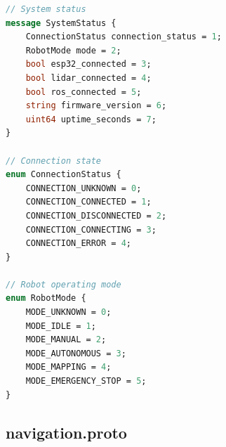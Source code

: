 \documentclass[11pt,letterpaper]{article}
\begin{document}
\begin{lstlisting}[language=Protobuf, caption=star/telemetry.proto]
// System status
message SystemStatus {
    ConnectionStatus connection_status = 1;
    RobotMode mode = 2;
    bool esp32_connected = 3;
    bool lidar_connected = 4;
    bool ros_connected = 5;
    string firmware_version = 6;
    uint64 uptime_seconds = 7;
}

// Connection state
enum ConnectionStatus {
    CONNECTION_UNKNOWN = 0;
    CONNECTION_CONNECTED = 1;
    CONNECTION_DISCONNECTED = 2;
    CONNECTION_CONNECTING = 3;
    CONNECTION_ERROR = 4;
}

// Robot operating mode
enum RobotMode {
    MODE_UNKNOWN = 0;
    MODE_IDLE = 1;
    MODE_MANUAL = 2;
    MODE_AUTONOMOUS = 3;
    MODE_MAPPING = 4;
    MODE_EMERGENCY_STOP = 5;
}
\end{lstlisting}

\subsection{navigation.proto}
\end{document}

